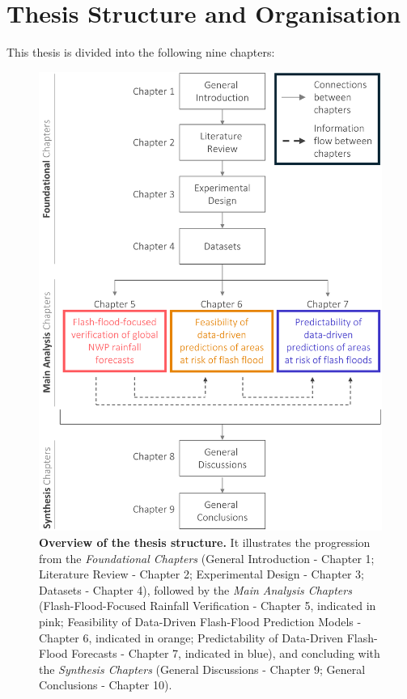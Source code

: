 \section{Thesis Structure and Organisation}
This thesis is divided into the following nine chapters:

\begin{figure}[htbp]
\centering
\includegraphics[width=\textwidth]{thesis_roadmap.png}
\caption{\textbf{Overview of the thesis structure.} It illustrates the progression from the \textit{Foundational Chapters} (General Introduction - Chapter 1; Literature Review - Chapter 2; Experimental Design - Chapter 3; Datasets - Chapter 4), followed by the \textit{Main Analysis Chapters} (Flash-Flood-Focused Rainfall Verification - Chapter 5, indicated in pink; Feasibility of Data-Driven Flash-Flood Prediction Models - Chapter 6, indicated in orange; Predictability of Data-Driven Flash-Flood Forecasts - Chapter 7, indicated in blue), and concluding with the \textit{Synthesis Chapters} (General Discussions - Chapter 9; General Conclusions - Chapter 10).}
\label{fig:thesis_structure}
\end{figure}

